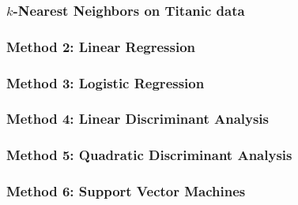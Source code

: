 \documentclass{beamer}
\begin{document}
\begin{frame}
\frametitle{$k$-Nearest Neighbors on Titanic data}
\end{frame}

\begin{frame}
\frametitle{Method 2: Linear Regression}
\end{frame}

\begin{frame}
\frametitle{Method 3: Logistic Regression}
\end{frame}

\begin{frame}
\frametitle{Method 4: Linear Discriminant Analysis}
\end{frame}

\begin{frame}
\frametitle{Method 5: Quadratic Discriminant Analysis}
\end{frame}

\begin{frame}
\frametitle{Method 6: Support Vector Machines}
\end{frame}
\end{document}
